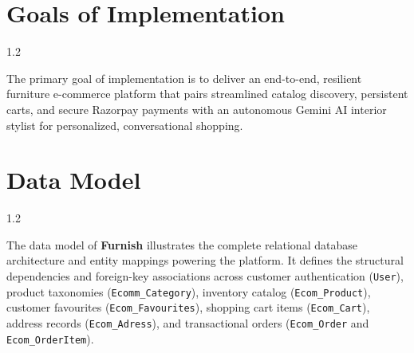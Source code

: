 \documentclass[12pt,a4paper]{article}
\begin{document}
\vspace{0.15in}



\section{Goals of Implementation}

\vspace{0.08in}

{\fontsize{13.5}{19.5}\selectfont
\begin{spacing}{1.2}

\noindent
The primary goal of implementation is to deliver an end-to-end, resilient furniture e-commerce platform that pairs streamlined catalog discovery, persistent carts, and secure Razorpay payments with an autonomous Gemini AI interior stylist for personalized, conversational shopping.

\end{spacing}
}

\vfill

\newpage



\section{Data Model}

\vspace{0.10in}

{\fontsize{13.5}{19.5}\selectfont
\begin{spacing}{1.2}

\noindent
The data model of \textbf{Furnish} illustrates the complete relational database architecture and entity mappings powering the platform. It defines the structural dependencies and foreign-key associations across customer authentication (\texttt{User}), product taxonomies (\texttt{Ecomm\_Category}), inventory catalog (\texttt{Ecom\_Product}), customer favourites (\texttt{Ecom\_Favourites}), shopping cart items (\texttt{Ecom\_Cart}), address records (\texttt{Ecom\_Adress}), and transactional orders (\texttt{Ecom\_Order} and \texttt{Ecom\_OrderItem}).

\end{spacing}
}
\end{document}
